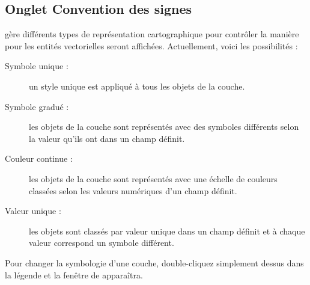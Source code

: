 \subsection{Onglet Convention des signes}\label{sec:symbology}

\qg gère différents types de représentation cartographique pour contrôler la manière pour les entités vectorielles seront affichées. Actuellement, voici les possibilités :

\begin{description}
\item[Symbole unique :]  un style unique est appliqué à tous les objets de la couche.
\item[Symbole gradué :]  les objets de la couche sont représentés avec des symboles différents selon la valeur qu'ils ont dans un champ définit.
\item[Couleur continue :] les objets de la couche sont représentés avec une échelle de couleurs classées selon les valeurs numériques d'un champ définit.
\item[Valeur unique :]  les objets sont classés par valeur unique dans un champ définit et à chaque valeur correspond un symbole différent.
\end{description}

Pour changer la symbologie d'une couche, double-cliquez simplement dessus dans la légende et la fenêtre de  apparaîtra.

